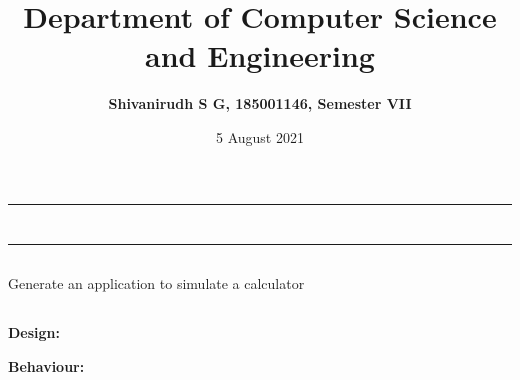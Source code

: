\documentclass[12pt,letterpaper]{article}
\title{\textbf{Department of Computer Science and Engineering}}
\author{\textbf{Shivanirudh S G, 185001146, Semester VII }}
\date{5 August 2021}
\begin{document}
\maketitle
\hrule
\section*{}
\hrule 
\bigskip\bigskip

\subsection*{}

\subsection*{}
\begin{flushleft}
    Generate an application to simulate a calculator   
\end{flushleft}

\subsection*{}
\subsubsection*{}
\textbf{Design:}
\begin{flushleft}

\end{flushleft}
\textbf{Behaviour:}
\begin{flushleft}

\end{flushleft}

\newpage
\end{document}
